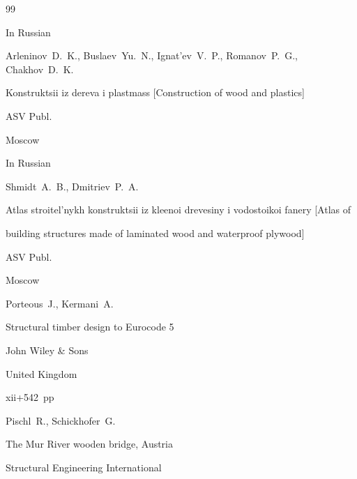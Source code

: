 \begin{thebibliography}{99}




\lang In Russian

\by Arleninov~D.~K., Buslaev~Yu.~N., Ignat'ev~V.~P., Romanov~P.~G., Chakhov~D.~K.

\book Konstruktsii iz dereva i plastmass \rm [Construction of wood and plastics]


\publ ASV Publ.

\publaddr Moscow







\lang In Russian

\by Shmidt~A.~B., Dmitriev~P.~A.

\book  Atlas stroitel'nykh konstruktsii iz kleenoi drevesiny i vodostoikoi fanery \rm [Atlas of

building structures made of laminated wood and waterproof plywood]


\publ ASV Publ.

\publaddr Moscow







\by Porteous~J., Kermani~A.

\book Structural timber design to Eurocode 5


\publ John Wiley \& Sons

\publaddr United Kingdom

\totalpages xii+542~pp \nofrills





\by Pischl~R., Schickhofer~G. 

\paper The Mur River wooden bridge, Austria 

\jour Structural Engineering International





\end{thebibliography}
